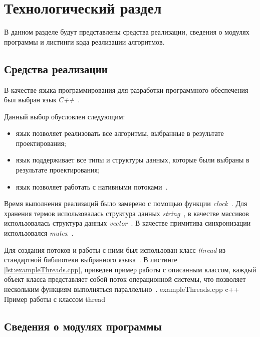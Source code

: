\chapter{Технологический раздел}

В данном разделе будут представлены средства реализации, сведения о модулях программы и листинги кода реализации алгоритмов.


\section{Средства реализации}

В качестве языка программирования для разработки программного обеспечения был выбран язык \textit{С++}~\cite{cpp}.

Данный выбор обусловлен следующим: 
\begin{itemize}
	\item язык позволяет реализовать все алгоритмы, выбранные в результате
	проектирования;
	\item язык поддерживает все типы и структуры данных, которые были выбраны в результате проектирования;
	\item язык позволяет работать с нативными потоками~\cite{thread}.
\end{itemize}


Время выполнения реализаций было замерено с помощью функции \textit{clock}~\cite{clock}. 
Для хранения термов использовалась структура данных \textit{string}~\cite{wstring}, в качестве массивов использовалась структура данных \textit{vector}~\cite{vector}.
В качестве примитива синхронизации использовался \textit{mutex}~\cite{mutex}.

Для создания потоков и работы с ними был использован класс \textit{thread} из стандартной библиотеки выбранного языка~\cite{thread}.
В листинге \ref{lst:exampleThreads.cpp}, приведен пример работы с описанным классом, каждый объект класса представляет собой поток операционной системы, что позволяет нескольким функциям выполняться параллельно~\cite{thread}. 
\clearpage
{}
{exampleThreads.cpp} %
{c++} %
{Пример работы с классом thread} %



\section{Сведения о модулях программы}

